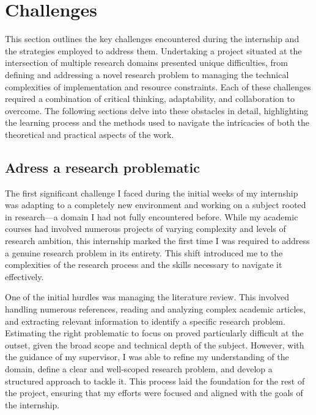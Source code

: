 \section{Challenges}
\label{sec:challenge}

This section outlines the key challenges encountered during the internship and the strategies employed to address them. Undertaking a project situated at the intersection of multiple research domains presented unique difficulties, from defining and addressing a novel research problem to managing the technical complexities of implementation and resource constraints. Each of these challenges required a combination of critical thinking, adaptability, and collaboration to overcome. The following sections delve into these obstacles in detail, highlighting the learning process and the methods used to navigate the intricacies of both the theoretical and practical aspects of the work.



\subsection{Adress a research problematic}
\label{sec:adress_research}
The first significant challenge I faced during the initial weeks of my internship was adapting to a completely new environment and working on a subject rooted in research—a domain I had not fully encountered before. While my academic courses had involved numerous projects of varying complexity and levels of research ambition, this internship marked the first time I was required to address a genuine research problem in its entirety. This shift introduced me to the complexities of the research process and the skills necessary to navigate it effectively.

One of the initial hurdles was managing the literature review. This involved handling numerous references, reading and analyzing complex academic articles, and extracting relevant information to identify a specific research problem. Estimating the right problematic to focus on proved particularly difficult at the outset, given the broad scope and technical depth of the subject. However, with the guidance of my supervisor, I was able to refine my understanding of the domain, define a clear and well-scoped research problem, and develop a structured approach to tackle it. This process laid the foundation for the rest of the project, ensuring that my efforts were focused and aligned with the goals of the internship.


